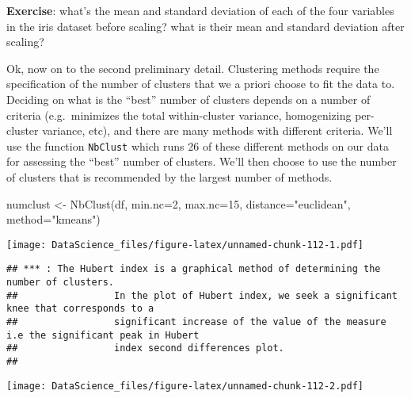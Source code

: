 \documentclass[
]{book}
\newenvironment{Shaded}{\begin{snugshade}}{\end{snugshade}}
\newcommand{\AttributeTok}[1]{\textcolor[rgb]{0.77,0.63,0.00}{#1}}
\newcommand{\DecValTok}[1]{\textcolor[rgb]{0.00,0.00,0.81}{#1}}
\newcommand{\FunctionTok}[1]{\textcolor[rgb]{0.00,0.00,0.00}{#1}}
\newcommand{\NormalTok}[1]{#1}
\newcommand{\OtherTok}[1]{\textcolor[rgb]{0.56,0.35,0.01}{#1}}
\newcommand{\StringTok}[1]{\textcolor[rgb]{0.31,0.60,0.02}{#1}}
\begin{document}
\textbf{Exercise}: what's the mean and standard deviation of each of the four variables in the iris dataset before scaling? what is their mean and standard deviation after scaling?

Ok, now on to the second preliminary detail. Clustering methods require the specification of the number of clusters that we a priori choose to fit the data to. Deciding on what is the ``best'' number of clusters depends on a number of criteria (e.g.~minimizes the total within-cluster variance, homogenizing per-cluster variance, etc), and there are many methods with different criteria. We'll use the function \texttt{NbClust} which runs 26 of these different methods on our data for assessing the ``best'' number of clusters. We'll then choose to use the number of clusters that is recommended by the largest number of methods.

\begin{Shaded}
\begin{Highlighting}[]
\NormalTok{numclust }\OtherTok{\textless{}{-}} \FunctionTok{NbClust}\NormalTok{(df, }\AttributeTok{min.nc=}\DecValTok{2}\NormalTok{, }\AttributeTok{max.nc=}\DecValTok{15}\NormalTok{, }\AttributeTok{distance=}\StringTok{"euclidean"}\NormalTok{, }\AttributeTok{method=}\StringTok{"kmeans"}\NormalTok{)}
\end{Highlighting}
\end{Shaded}

\texttt{[image: DataScience\_files/figure-latex/unnamed-chunk-112-1.pdf]}

\begin{verbatim}
## *** : The Hubert index is a graphical method of determining the number of clusters.
##                 In the plot of Hubert index, we seek a significant knee that corresponds to a 
##                 significant increase of the value of the measure i.e the significant peak in Hubert
##                 index second differences plot. 
## 
\end{verbatim}

\texttt{[image: DataScience\_files/figure-latex/unnamed-chunk-112-2.pdf]}
\end{document}
